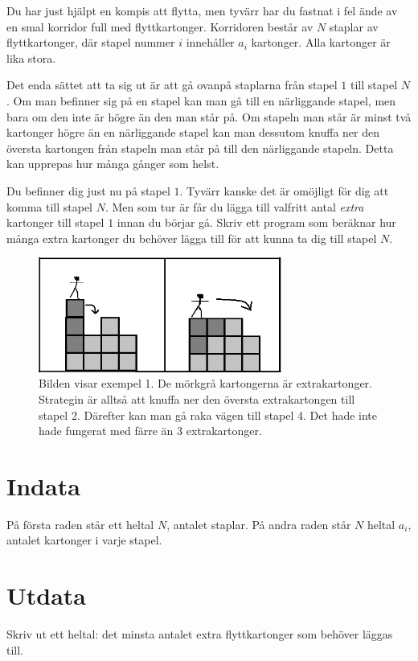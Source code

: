 

Du har just hjälpt en kompis att flytta, men tyvärr har du fastnat i
fel ände av en smal korridor full med flyttkartonger. Korridoren
består av $N$ staplar av flyttkartonger, där stapel nummer $i$
innehåller $a_i$ kartonger. Alla kartonger är lika stora.

Det enda sättet att ta sig ut är att gå ovanpå staplarna från stapel
$1$ till stapel $N$. Om man befinner sig på en stapel kan man gå till
en närliggande stapel, men bara om den inte är högre än den man står
på. Om stapeln man står är minst två kartonger högre än en närliggande
stapel kan man dessutom knuffa ner den översta kartongen från stapeln
man står på till den närliggande stapeln. Detta kan upprepas hur många
gånger som helst. 

Du befinner dig just nu på stapel $1$. Tyvärr kanske det är omöjligt
för dig att komma till stapel $N$. Men som tur är får du lägga till
valfritt antal {\em extra} kartonger till stapel $1$ innan du börjar gå. Skriv ett program som
beräknar hur många extra kartonger du behöver lägga till för att kunna
ta dig till stapel $N$.

\begin{figure}[!h]
\begin{center}
\includegraphics[width=8cm]{kartongbild2.png}
\end{center}
\caption{Bilden visar exempel 1. De mörkgrå kartongerna är extrakartonger. Strategin är alltså att knuffa ner den översta extrakartongen till stapel 2. Därefter kan man gå raka vägen till stapel 4. Det hade inte hade fungerat med färre än 3 extrakartonger.}
\end{figure}

\section*{Indata}
På första raden står ett heltal $N$, antalet staplar. På andra raden står $N$ heltal $a_i$, antalet kartonger i varje stapel. 

\section*{Utdata}
Skriv ut ett heltal: det minsta antalet extra flyttkartonger som behöver läggas till.


